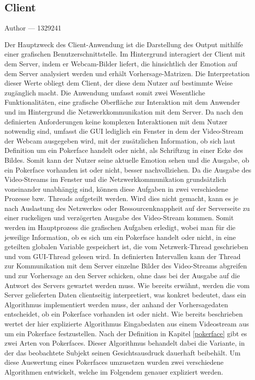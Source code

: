 \documentclass[12pt, a4paper]{report}
\makeatletter
\newcommand{\sectionauthor}[1]{%
  {\parindent0pt\vspace*{-5pt}%
  \large{Author --- }
  \linespread{1.1}\large\scshape#1%
  \par\nobreak\vspace*{35pt} }
  \@afterheading%
}
\makeatother
\begin{document}
\subsection{Client}
\sectionauthor{1329241}
Der Hauptzweck des Client-Anwendung ist die Darstellung des Output mithilfe einer grafischen Benutzerschnittstelle. Im Hintergrund interagiert der Client mit dem Server, indem er Webcam-Bilder liefert, die hinsichtlich der Emotion auf dem Server analysiert werden und erhält Vorhersage-Matrizen. Die Interpretation dieser Werte obliegt dem Client, der diese dem Nutzer auf bestimmte Weise zugänglich macht. Die Anwendung umfasst somit zwei Wesentliche Funktionalitäten, eine grafische Oberfläche zur Interaktion mit dem Anwender und im Hintergrund die Netzwerkkommunikation mit dem Server. Da nach den definierten Anforderungen keine komplexen Interaktionen mit dem Nutzer notwendig sind, umfasst die GUI lediglich ein Fenster in dem der Video-Stream der Webcam ausgegeben wird, mit der zusätzlichen Information, ob sich laut Definition um ein Pokerface handelt oder nicht, als Schriftzug in einer Ecke des Bildes. Somit kann der Nutzer seine aktuelle Emotion sehen und die Ausgabe, ob ein Pokerface vorhanden ist oder nicht, besser nachvollziehen. Da die Ausgabe des Video-Streams im Fenster und die Netzwerkkommunikation grundsätzlich voneinander unabhängig sind, können diese Aufgaben in zwei verschiedene Prozesse bzw. Threads aufgeteilt werden. Wird dies nicht gemacht, kann es je nach Auslastung des Netzwerkes oder Ressourcenknappheit auf der Serverseite zu einer ruckeligen und verzögerten Ausgabe des Video-Stream kommen. Somit werden im Hauptprozess die grafischen Aufgaben erledigt, wobei man für die jeweilige Information, ob es sich um ein Pokerface handelt oder nicht, in eine geteilten globalen Variable gespeichert ist, die vom Netzwerk-Thread geschrieben und vom GUI-Thread gelesen wird. In definierten Intervallen kann der Thread zur Kommunikation mit dem Server einzelne Bilder des Video-Streams abgreifen und zur Vorhersage an den Server schicken, ohne dass bei der Ausgabe auf die Antwort des Servers gewartet werden muss. Wie bereits erwähnt, werden die vom Server gelieferten Daten clientseitig interpretiert, was konkret bedeutet, dass ein Algorithmus implementiert werden muss, der anhand der Vorhersagedaten entscheidet, ob ein Pokerface vorhanden ist oder nicht.\newline
Wie bereits beschrieben wertet der hier explizierte Algorithmus Eingabedaten aus einem Videostream aus um ein Pokerface festzustellen. Nach der Definition in Kapitel 
\ref{pokerface} gibt es zwei Arten von Pokerfaces. Dieser Algorithmus behandelt dabei die Variante, in der das beobachtete Subjekt seinen Gesichtsausdruck dauerhaft beibehält. 
\newline
Um diese Auswertung eines Pokerfaces umzusetzen wurden zwei verschiedene Algorithmen entwickelt, welche im Folgendem genauer expliziert werden.
\end{document}
